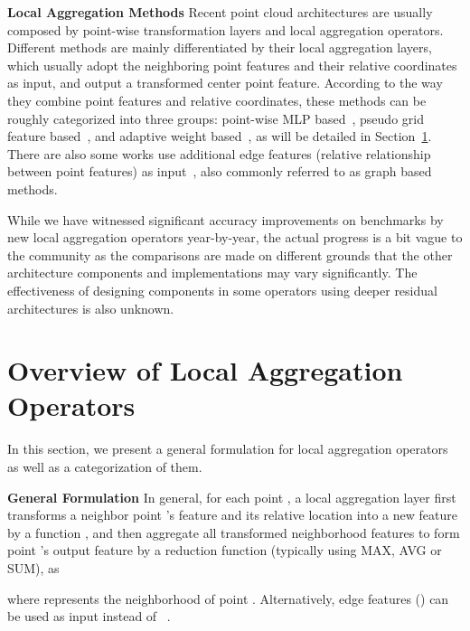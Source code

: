 \documentclass[runningheads]{llncs}
\begin{document}
\vspace{0.3em} \noindent \textbf{Local Aggregation Methods} Recent point cloud architectures are usually composed by  point-wise transformation layers and local aggregation operators. Different methods are mainly differentiated by their local aggregation layers, which usually adopt the neighboring point features and their relative coordinates as input, and output a transformed center point feature. According to the way they combine point features and relative coordinates, these methods can be roughly categorized into three groups: point-wise MLP based~\cite{qi2017pointnet++,li2019can,komarichev2019cnn}, pseudo grid feature based~\cite{hua2018pointwise,mao2019interpolated,zhang2019shellnet,lan2019modeling,tatarchenko2018tangent,thomas2019kpconv}, and adaptive weight based~\cite{wang2018paramconv,groh2018flex,liu2019rscnn,wu2019pointconv,li2018pointcnn}, as will be detailed in Section~\ref{sec.review}. There are also some works use additional edge features (relative relationship between point features) as input~\cite{li2019can,wang2019graph,wang2019dynamic}, also commonly referred to as graph based methods.

While we have witnessed significant accuracy improvements on benchmarks by new local aggregation operators year-by-year, the actual progress is a bit vague to the community as the comparisons are made on different grounds that the other architecture components and implementations may vary significantly. The effectiveness of designing components in some operators using deeper residual architectures is also unknown.

\section{Overview of Local Aggregation Operators}
\label{sec.review}

In this section, we present a general formulation for local aggregation operators as well as a categorization of them.

\vspace{0.3em} \noindent \textbf{General Formulation} In general, for each point , a local aggregation layer first transforms a neighbor point 's feature  and its relative location  into a new feature by a function , and then aggregate all transformed neighborhood features to form point 's output feature by a reduction function  (typically using MAX, AVG or SUM), as

where  represents the neighborhood of point . Alternatively, edge features  () can be used as input instead of ~\cite{wang2019dynamic}.
\end{document}
